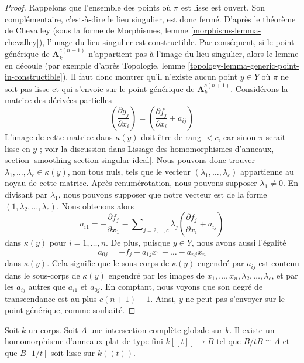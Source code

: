 \begin{proof}
Rappelons que l'ensemble des points où $\pi$ est lisse est ouvert.
Son complémentaire, c'est-à-dire le lieu singulier, est donc fermé.
D'après le théorème de Chevalley (sous la forme de
Morphismes, lemme \ref{morphisms-lemma-chevalley}),
l'image du lieu singulier est constructible.
Par conséquent, si le point générique de $\mathbf{A}^{c(n + 1)}_k$
n'appartient pas à l'image du lieu singulier, alors
le lemme en découle (par exemple d'après Topologie, lemme
\ref{topology-lemma-generic-point-in-constructible}).
Il faut donc montrer qu'il n'existe aucun point
$y \in Y$ où $\pi$ ne soit pas lisse et qui s'envoie sur
le point générique de $\mathbf{A}^{c(n + 1)}_k$.
Considérons la matrice des dérivées partielles
$$
(\frac{\partial g_j}{\partial x_i}) =
(\frac{\partial f_j}{\partial x_i} + a_{ij})
$$
L'image de cette matrice dans $\kappa(y)$ doit être de rang $< c$,
car sinon $\pi$ serait lisse en $y$ ; voir la discussion dans
Lissage des homomorphismes d'anneaux, section \ref{smoothing-section-singular-ideal}.
Nous pouvons donc trouver $\lambda_1, \ldots, \lambda_c \in \kappa(y)$,
non tous nuls, tels que le vecteur $(\lambda_1, \ldots, \lambda_c)$
appartienne au noyau de cette matrice.
Après renumérotation, nous pouvons supposer $\lambda_1 \not = 0$.
En divisant par $\lambda_1$, nous pouvons supposer que notre vecteur est
de la forme $(1, \lambda_2, \ldots, \lambda_c)$.
Nous obtenons alors
$$
a_{i1} = -
\frac{\partial f_j}{\partial x_1} -
\sum\nolimits_{j = 2, \ldots, c} \lambda_j(\frac{\partial f_j}{\partial x_i} + a_{ij})
$$
dans $\kappa(y)$ pour $i = 1, \ldots, n$. De plus, puisque $y \in Y$, nous avons aussi
l'égalité
$$
a_{0j} = -f_j - a_{1j}x_1 - \ldots - a_{nj}x_n
$$
dans $\kappa(y)$. Cela signifie que le sous-corps de $\kappa(y)$
engendré par $a_{ij}$ est contenu dans le sous-corps de $\kappa(y)$
engendré par les images de $x_1, \ldots, x_n, \lambda_2, \ldots, \lambda_c$,
et par les $a_{ij}$ autres que $a_{i1}$ et $a_{0j}$.
En comptant, nous voyons que son degré de transcendance est
au plus $c(n + 1) - 1$. Ainsi, $y$ ne peut pas s'envoyer sur le point générique,
comme souhaité.
\end{proof}

\begin{lemma}
\label{lemma-smoothing-affine-lci}
Soit $k$ un corps. Soit $A$ une intersection complète globale
sur $k$. Il existe un homomorphisme d'anneaux plat de type fini
$k[[t]] \to B$ tel que $B/tB \cong A$ et que
$B[1/t]$ soit lisse sur $k((t))$.
\end{lemma}

